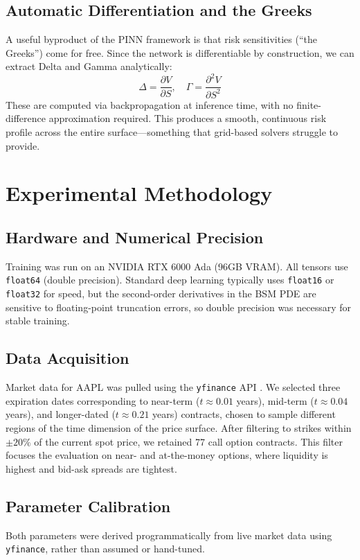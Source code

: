 \documentclass[11pt, twocolumn]{article}
\begin{document}
\subsection{Automatic Differentiation and the Greeks}
A useful byproduct of the PINN framework is that risk sensitivities (``the Greeks'') come for free. Since the network is differentiable by construction, we can extract Delta and Gamma analytically:
\begin{equation}
\Delta = \frac{\partial V}{\partial S}, \quad \Gamma = \frac{\partial^2 V}{\partial S^2}
\end{equation}
These are computed via backpropagation at inference time, with no finite-difference approximation required. This produces a smooth, continuous risk profile across the entire surface—something that grid-based solvers struggle to provide.

\section{Experimental Methodology}
\subsection{Hardware and Numerical Precision}
Training was run on an NVIDIA RTX 6000 Ada (96GB VRAM). All tensors use \texttt{float64} (double precision). Standard deep learning typically uses \texttt{float16} or \texttt{float32} for speed, but the second-order derivatives in the BSM PDE are sensitive to floating-point truncation errors, so double precision was necessary for stable training.

\subsection{Data Acquisition}
Market data for AAPL was pulled using the \texttt{yfinance} API \cite{yfinance2024}. We selected three expiration dates corresponding to near-term ($t \approx 0.01$ years), mid-term ($t \approx 0.04$ years), and longer-dated ($t \approx 0.21$ years) contracts, chosen to sample different regions of the time dimension of the price surface. After filtering to strikes within $\pm 20\%$ of the current spot price, we retained 77 call option contracts. This filter focuses the evaluation on near- and at-the-money options, where liquidity is highest and bid-ask spreads are tightest.

\subsection{Parameter Calibration}
Both parameters were derived programmatically from live market data using \texttt{yfinance}, rather than assumed or hand-tuned.
\end{document}
